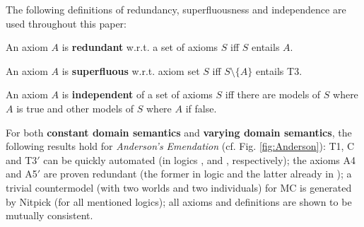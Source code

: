\documentclass{birkjour}
\theoremstyle{definition}
\theoremstyle{remark}
\numberwithin{equation}{section}
\begin{document}
\begin{samepage}
The following definitions of redundancy, superfluousness and independence are used throughout this paper:

\begin{definition}
An axiom $A$ is \textbf{redundant} w.r.t. a set of axioms $S$ iff $S$ entails $A$. 
\end{definition}

\begin{definition}
An axiom $A$ is \textbf{superfluous} w.r.t. axiom set $S$ iff $S \setminus \{ A \}$ entails T3.
\end{definition}

\begin{definition}
  An axiom $A$ is \textbf{independent} of a set of axioms $S$ iff
  there are models of $S$ where $A$ is true and other models of
  $S$ where $A$ if false.
\end{definition}
\end{samepage}

\clearpage

For both \textbf{constant domain semantics} and \textbf{varying domain
semantics}, the following results hold for \emph{Anderson's
Emendation} (cf. Fig. \ref{fig:Anderson}): T1, C
and T3$'$ can be quickly automated (in logics \K, \K and \KB,
respectively); the axioms A4 and A5$'$ are proven redundant (the former in logic \KFourB and the latter
already in \K); a trivial countermodel (with two worlds and  two
individuals) for MC is generated by Nitpick (for all mentioned
logics); all axioms and definitions are shown to be mutually
consistent.
\end{document}
